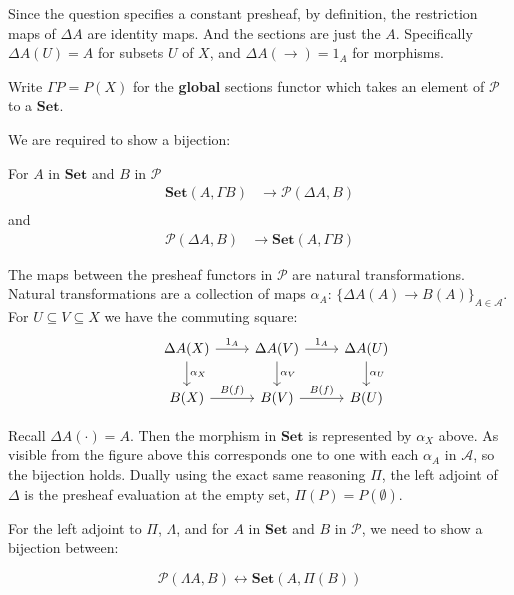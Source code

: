 \documentclass{article}
\begin{document}
Since the question specifies a constant presheaf, by definition, the restriction maps of $\Delta A$ are identity maps. And the sections are just the $A$.
Specifically $\Delta A (U) = A$ for subsets $U$ of $X$, and $\Delta A (\rightarrow) = 1_A$ for morphisms.

Write $\Gamma P = P(X)$ for the \textbf{global} sections functor which takes an element of $\mathcal{P}$ to a $\mathbf{Set}$.

We are required to show a bijection:

For $A$ in $\mathbf{Set}$ and $B$ in $\mathcal{P}$
\begin{align*}
  \mathbf{Set}(A, \Gamma B) &\rightarrow \mathcal{P}(\Delta A, B)\\
\end{align*}
and
\begin{align*}
   \mathcal{P}(\Delta A, B) &\rightarrow \mathbf{Set}(A, \Gamma B)
\end{align*}

The maps between the presheaf functors in $\mathcal{P}$ are natural transformations. Natural transformations are a collection of maps $\alpha_A$: $\{ \Delta A (A) \rightarrow B(A) \}_{A \in \mathcal{A}}$. For $U \subseteq V \subseteq X$ we have the commuting square:
\begin{equation}
\label{eqn:13291}
\begin{tikzcd}
  & \Delta A(X) \arrow[d,"\alpha_X"] \arrow[r, "1_A"] & \Delta A(V) \arrow[d,"\alpha_{V}"] \arrow[r, "1_A"] & \Delta A(U) \arrow[d,"\alpha_{U}"{name=G,right}]\\
  & B(X) \arrow[r,"B(f)"] & B(V) \arrow[r,"B(f)"] & B(U)
\end{tikzcd}
\end{equation}

Recall $\Delta A (\cdot) = A$. Then the morphism in $\mathbf{Set}$ is represented by $\alpha_X$ above. As visible from the figure above this corresponds one to one with each $\alpha_A$ in $\mathcal{A}$, so the bijection holds. Dually using the exact same reasoning $\Pi$, the left adjoint of $\Delta$ is the presheaf evaluation at the empty set, $\Pi (P) = P(\emptyset)$.

For the left adjoint to $\Pi$, $\Lambda$, and for $A$ in $\mathbf{Set}$ and $B$ in $\mathcal{P}$, we need to show a bijection between:

\begin{equation*}
  \mathcal{P}(\Lambda A, B) \leftrightarrow \mathbf{Set}(A, \Pi(B))
\end{equation*}
\end{document}
